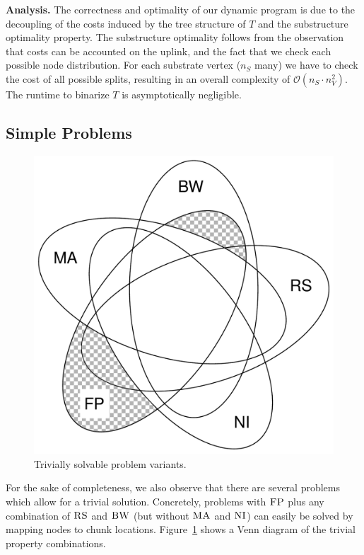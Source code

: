 \documentclass[preprint,12pt]{elsarticle}
\newcommand{\CC}{\textsc{NI}}
\newcommand{\FP}{\textsc{FP}}
\newcommand{\RS}{\textsc{RS}}
\newcommand{\BW}{\textsc{BW}}
\newcommand{\MA}{\textsc{MA}}
\newcommand{\Tree}{\ensuremath{T}}
\begin{document}
\textbf{Analysis.}
The correctness and optimality of our dynamic program
is due to the decoupling of the costs induced by the tree
structure of $\Tree$ and the  substructure
optimality property.
The substructure optimality follows from the observation that
costs can be accounted on the uplink, and the fact
 that we check each possible node distribution.
For each substrate vertex ($n_S$ many) we have
to check the cost of all possible splits,
resulting in an overall complexity of $\mathcal{O}(n_S \cdot n_V^2)$.
The runtime to binarize $\Tree$ is asymptotically negligible.




\subsection{Simple Problems}

\begin{figure}
\vspace{-1em}
\includegraphics[width=0.48\columnwidth]{figs/venn_trivial.pdf}
\caption{Trivially solvable problem variants.}
\label{fig:venn_trivial}
\vspace{-1em}
\end{figure}
For the sake of completeness, we also observe that there are
several problems which
allow for a trivial solution. Concretely, problems with $\FP$
plus any combination of
$\RS$ and $\BW$ (but without $\MA$ and $\CC$) can easily be solved by
mapping
nodes to chunk locations.
Figure~\ref{fig:venn_trivial}
shows a Venn diagram of the trivial property combinations.
\end{document}
